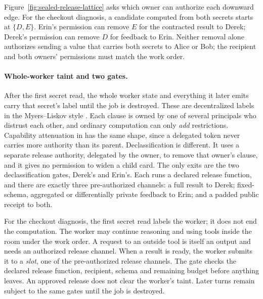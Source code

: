 \documentclass[11pt,a4paper]{article}
\theoremstyle{definition}
\begin{document}
Figure~\ref{fig:sealed-release-lattice} asks which owner can authorize each
downward edge. For the checkout diagnosis, a candidate computed from both
secrets starts at $\{D,E\}$. Erin's permission can remove $E$ for the
contracted result to Derek; Derek's permission can remove $D$ for feedback
to Erin. Neither removal alone authorizes sending a value that carries both
secrets to Alice or Bob; the recipient and both owners' permissions must match
the work order.


\pdmarginpagebreak


\paragraph{Whole-worker taint and two gates.}
After the first secret read, the whole worker state and everything it later
emits carry that secret's label until the job is destroyed. These are
decentralized labels in the Myers--Liskov style . Each
clause is owned by one of several principals who distrust each other, and
ordinary computation can only \emph{add} restrictions. Capability attenuation
in  has the same shape, since a
delegated token never carries more authority than its parent. Declassification
is different. It uses a separate release authority, delegated by the owner,
to remove that owner's clause, and it gives no permission to widen a child
card. The only exits are the two declassification gates, Derek's and Erin's.
Each runs a declared release function, and there are exactly three
pre-authorized channels: a full result to Derek; fixed-schema, aggregated or
differentially private feedback to Erin; and a padded public receipt to both.

For the checkout diagnosis, the first secret read labels the worker; it does
not end the computation. The worker may continue reasoning and using tools
inside the room under the work order. A request to an outside tool is itself
an output and needs an authorized release channel. When a result is ready,
the worker submits it to a \emph{slot}, one of the pre-authorized release
channels. The gate checks the declared release function, recipient, schema and
remaining budget before anything leaves. An approved release does not clear the worker's taint. Later turns
remain subject to the same gates until the job is destroyed.
\end{document}

